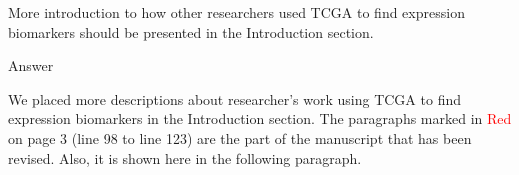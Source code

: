 \documentclass[preprint,12pt]{elsarticle}
\newenvironment{MyIndent}
{\par\leftskip1cm\relax\rightskip1cm\relax}
{\par\leftskip0cm\relax\rightskip0cm\relax}
\newenvironment{MyColorPar}[1]{%
    \leavevmode\color{#1}\ignorespaces%
}{%
}%
\begin{document}
\begin{MyColorPar}{blue}
\begin{MyColorPar}{black}
More introduction to how other researchers used TCGA to find expression biomarkers should be presented in the Introduction section.
\end{MyColorPar}

Answer

We placed more descriptions about researcher's work using TCGA to find expression biomarkers in the Introduction section.
The paragraphs marked in \textcolor{red}{Red} on page 3 (line 98 to line 123) are the part of the manuscript that has been revised. Also, it is shown here in the following paragraph.\\[0.3cm]


\begin{MyIndent}
\begin{MyColorPar}{red}


\end{MyColorPar}
\end{MyIndent}
\end{MyColorPar}
\end{document}
